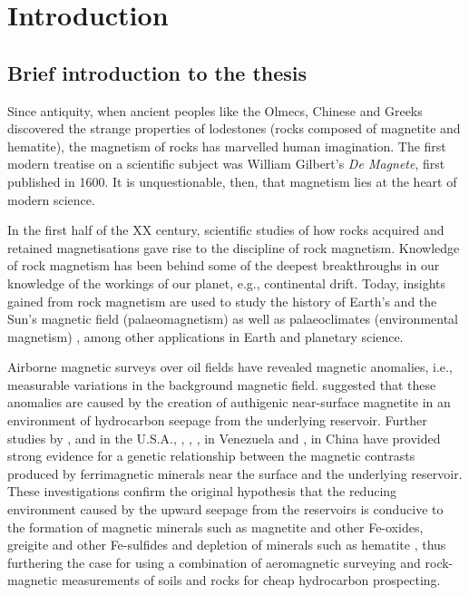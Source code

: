 \chapter{Introduction}
\label{ch:intro}
\fancyhead[C]{}
\fancyhead[R]{}
\fancyfoot[C]{\thepage}

\section{Brief introduction to the thesis}
Since antiquity, when ancient peoples like the Olmecs, Chinese and Greeks \citep{Carlson1975,Evans1977,May1981} discovered the strange properties of lodestones (rocks composed of magnetite and hematite), the magnetism of rocks has marvelled human imagination. The first modern treatise on a scientific subject was William Gilbert's \emph{De Magnete}, first published in 1600. It is unquestionable, then, that magnetism lies at the heart of modern science.\par

In the first half of the XX century, scientific studies \citep{Koenigsberger1938,Thellier1938,Nagata1943} of how rocks acquired and retained magnetisations gave rise to the discipline of rock magnetism. Knowledge of rock magnetism has been behind some of the deepest breakthroughs in our knowledge of the workings of our planet, e.g., continental drift. Today, insights gained from rock magnetism are used to study the history of Earth's and the Sun's magnetic field (palaeomagnetism) \citep{Dunlop} as well as palaeoclimates (environmental magnetism) \citep{Evans}, among other applications in Earth and planetary science.\par

Airborne magnetic surveys over oil fields \citep{Donovan1979} have revealed magnetic anomalies, i.e., measurable variations in the background magnetic field. \citet{Donovan1979} suggested that these anomalies are caused by the creation of authigenic near-surface magnetite in an environment of hydrocarbon seepage from the underlying reservoir. Further studies by \citet{Donovan1984}, \citet{Elmore1993} and \citet{Reynolds1993} in the U.S.A., \citet{Diaz2000}, \citet{Costanzo2006,Costanzo2012}, \citet{Gonzalez2002}, \citet{Guzman2011} in Venezuela and \citet{Liu1999}, \citet{Liu2004,Liu2006} in China have provided strong evidence for a genetic relationship between the magnetic contrasts produced by ferrimagnetic minerals near the surface and the underlying reservoir. These investigations confirm the original hypothesis \citep{Donovan1979} that the reducing environment caused by the upward seepage from the reservoirs is conducive to the formation of magnetic minerals such as magnetite and other Fe-oxides, greigite and other Fe-sulfides and depletion of minerals such as hematite \citep{Machel1991} , thus furthering the case for using a combination of aeromagnetic surveying and rock-magnetic measurements of soils and rocks for cheap hydrocarbon prospecting.\par

